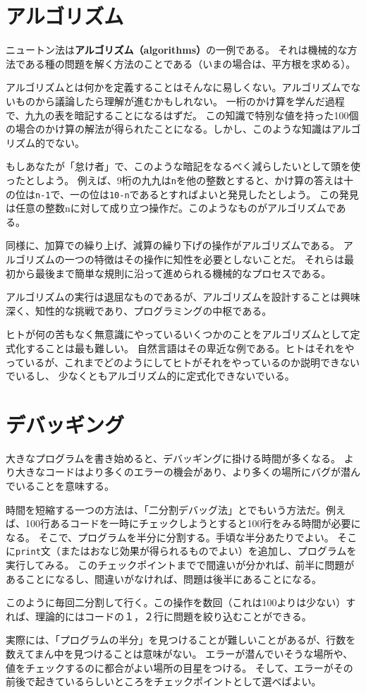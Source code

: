 \documentclass[a4j,12pt,makeidx]{jbook}
\begin{document}
\section{アルゴリズム}
ニュートン法は{\bf アルゴリズム（algorithms）}の一例である。
それは機械的な方法である種の問題を解く方法のことである（いまの場合は、平方根を求める）。\par
アルゴリズムとは何かを定義することはそんなに易しくない。アルゴリズムでないものから議論したら理解が進むかもしれない。
一桁のかけ算を学んだ過程で、九九の表を暗記することになるはずだ。
この知識で特別な値を持った100個の場合のかけ算の解法が得られたことになる。しかし、このような知識はアルゴリズム的でない。 \par
もしあなたが「怠け者」で、このような暗記をなるべく減らしたいとして頭を使ったとしよう。
例えば、9桁の九九は{\tt n}を他の整数とすると、かけ算の答えは十の位は{\tt n-1}で、一の位は{\tt 10-n}であるとすればよいと発見したとしよう。
この発見は任意の整数nに対して成り立つ操作だ。このようなものがアルゴリズムである。 \par
同様に、加算での繰り上げ、減算の繰り下げの操作がアルゴリズムである。
アルゴリズムの一つの特徴はその操作に知性を必要としないことだ。
それらは最初から最後まで簡単な規則に沿って進められる機械的なプロセスである。\par
アルゴリズムの実行は退屈なものであるが、アルゴリズムを設計することは興味深く、知性的な挑戦であり、プログラミングの中枢である。\par
ヒトが何の苦もなく無意識にやっているいくつかのことをアルゴリズムとして定式化することは最も難しい。
自然言語はその卑近な例である。ヒトはそれをやっているが、これまでどのようにしてヒトがそれをやっているのか説明できないでいるし、
少なくともアルゴリズム的に定式化できないでいる。
%
\section{デバッギング}
大きなプログラムを書き始めると、デバッギングに掛ける時間が多くなる。
より大きなコードはより多くのエラーの機会があり、より多くの場所にバグが潜んでいることを意味する。\par
時間を短縮する一つの方法は、「二分割デバッグ法」とでもいう方法だ。例えば、100行あるコードを一時にチェックしようとすると100行をみる時間が必要になる。
そこで、プログラムを半分に分割する。手頃な半分あたりでよい。
そこに{\tt print}文（またはおなじ効果が得られるものでよい）を追加し、プログラムを実行してみる。
このチェックポイントまでで間違いが分かれば、前半に問題があることになるし、間違いがなければ、問題は後半にあることになる。\par
このように毎回二分割して行く。この操作を数回（これは100よりは少ない）すれば、理論的にはコードの１，２行に問題を絞り込むことができる。\par
実際には、「プログラムの半分」を見つけることが難しいことがあるが、行数を数えてまん中を見つけることは意味がない。
エラーが潜んでいそうな場所や、値をチェックするのに都合がよい場所の目星をつける。
そして、エラーがその前後で起きているらしいところをチェックポイントとして選べばよい。
%
\end{document}
